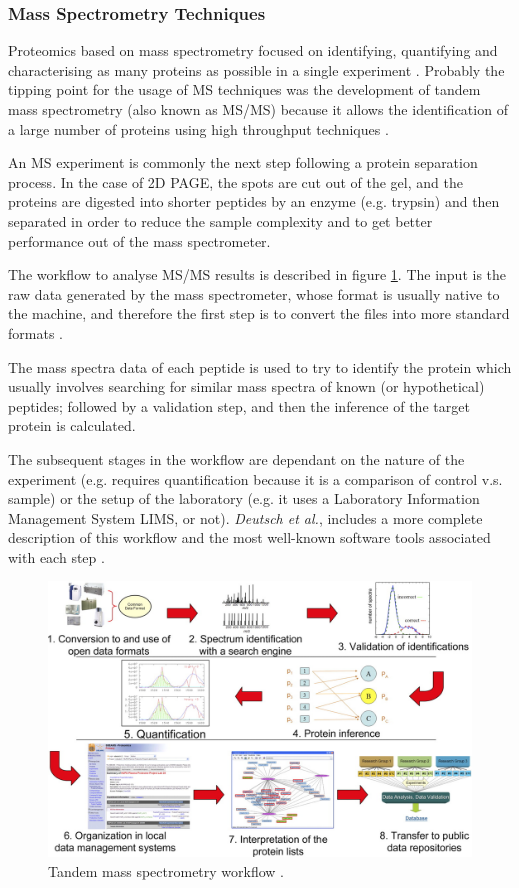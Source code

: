 \subsubsection{Mass Spectrometry Techniques}
Proteomics based on mass spectrometry focused on identifying, quantifying and characterising as many proteins as possible in a single experiment . Probably the tipping point for the usage of MS techniques was the development of tandem mass spectrometry (also known as MS/MS) because it allows the identification of a large number of proteins using high throughput techniques \cite{PAN2008}.

An MS experiment is commonly the next step following a protein separation process. In the case of 2D PAGE, the spots are cut out of the gel, and the proteins are digested into shorter peptides by an enzyme (e.g. trypsin) and then separated in order to reduce the sample complexity and to get better performance out of the mass spectrometer.

The workflow to analyse MS/MS results is described in figure \ref{fig:ms_workflow}. The input is the raw data generated by the mass spectrometer, whose format is usually native to the machine, and therefore the first step is to convert the files into more standard formats \cite{DEU2008}. 

The mass spectra data of each peptide is used to try to identify the protein which usually involves searching for similar mass spectra of known (or hypothetical) peptides; followed by a validation step, and then the inference of the target protein is calculated.

The subsequent stages in the workflow are dependant on the nature of the experiment (e.g. requires quantification because it is a comparison of control v.s. sample) or the setup of the laboratory (e.g. it uses a Laboratory Information Management System LIMS, or not). \emph{Deutsch et al.}, includes a more complete description of this workflow and the most well-known software tools associated with each step \cite{DEU2008}.

\begin{figure}  
\centering
\includegraphics[width=6in]{figures/ms_workflow.png}
\caption[Tandem mass spectrometry workflow.]{Tandem mass spectrometry workflow \cite{DEU2008}.
\label{fig:ms_workflow}}
\end{figure}


